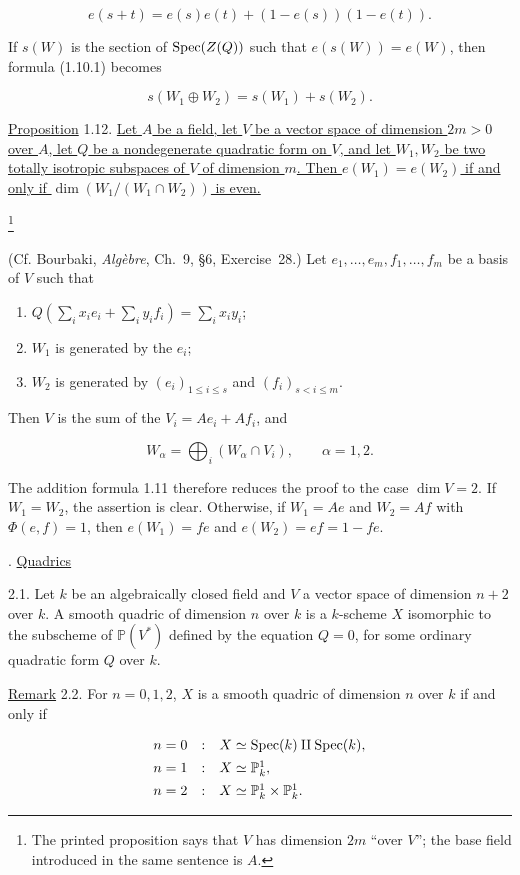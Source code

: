 \begin{equation*}
e(s+t)=e(s)e(t)+(1-e(s))(1-e(t)).
\end{equation*}

If $s(W)$ is the section of $\operatorname{Spec}(Z(Q))$ such that $e(s(W))=e(W)$, then
formula (1.10.1) becomes

\begin{equation*}
s(W_1\oplus W_2)=s(W_1)+s(W_2).
\end{equation*}

\underline{Proposition} 1.12. \underline{Let $A$ be a field, let $V$ be
a vector space of dimension $2m>0$ over $A$, let $Q$ be a nondegenerate
quadratic form on $V$, and let $W_1,W_2$ be two totally isotropic
subspaces of $V$ of dimension $m$.  Then $e(W_1)=e(W_2)$ if and only if
$\dim(W_1/(W_1\cap W_2))$ is even.}

\footnote{The printed proposition says that $V$ has dimension $2m$ ``over
$V$''; the base field introduced in the same sentence is $A$.}


(Cf. Bourbaki, \emph{Algèbre}, Ch.~9, \S6, Exercise~28.)  Let
$e_1,\ldots,e_m,f_1,\ldots,f_m$ be a basis of $V$ such that

\begin{enumerate}[label=\alph*),leftmargin=2.5em]
\item $Q(\sum_i x_i e_i+\sum_i y_i f_i)=\sum_i x_i y_i$;
\item $W_1$ is generated by the $e_i$;
\item $W_2$ is generated by $(e_i)_{1\leq i\leq s}$ and
$(f_i)_{s<i\leq m}$.
\end{enumerate}

Then $V$ is the sum of the $V_i=Ae_i+Af_i$, and

\begin{equation*}
W_\alpha=\bigoplus_i(W_\alpha\cap V_i),
\qquad \alpha=1,2.
\end{equation*}

The addition formula 1.11 therefore reduces the proof to the case
$\dim V=2$.  If $W_1=W_2$, the assertion is clear.  Otherwise, if
$W_1=Ae$ and $W_2=Af$ with $\Phi(e,f)=1$, then
$e(W_1)=fe$ and $e(W_2)=ef=1-fe$.

. \underline{Quadrics}

2.1. Let $k$ be an algebraically closed field and $V$ a vector space of
dimension $n+2$ over $k$.  A smooth quadric of dimension $n$ over $k$ is
a $k$-scheme $X$ isomorphic to the subscheme of $\mathbb P(V^*)$ defined
by the equation $Q=0$, for some ordinary quadratic form $Q$ over $k$.

\underline{Remark} 2.2. For $n=0,1,2$, $X$ is a smooth quadric of
dimension $n$ over $k$ if and only if

\begin{equation*}
\begin{array}{rcl}
n=0 &:& X\simeq\operatorname{Spec}(k)\amalg\operatorname{Spec}(k),\\[1ex]
n=1 &:& X\simeq\mathbb P^1_k,\\[1ex]
n=2 &:& X\simeq\mathbb P^1_k\times\mathbb P^1_k.
\end{array}
\end{equation*}

